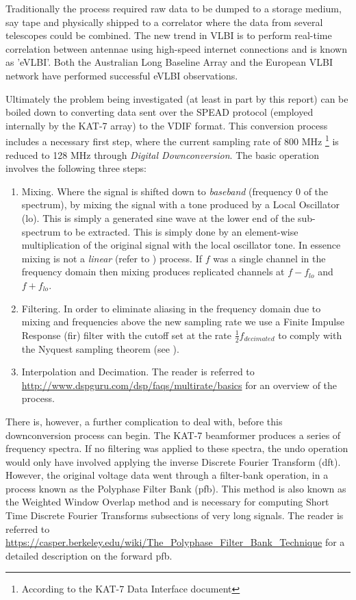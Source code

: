 \documentclass[a4paper,10pt]{article}
\begin{document}
Traditionally the process required raw data to be dumped to a storage medium, say tape and physically shipped to a correlator where the data from several 
telescopes could be combined. The new trend in VLBI is to perform real-time correlation between antennae using high-speed internet connections and is known
as 'eVLBI'. Both the Australian Long Baseline Array and the European VLBI network have performed successful eVLBI observations.

Ultimately the problem being investigated (at least in part by this report) can be boiled down to converting data sent over the SPEAD protocol (employed 
internally by the KAT-7 array) to the VDIF format. This conversion process includes a necessary first step, where the current sampling rate of 800 MHz
\footnote{According to the KAT-7 Data Interface document} is reduced to 128 MHz through \textit{Digital Downconversion}. The basic operation involves the following three
steps:
\begin{enumerate}
 \item Mixing. Where the signal is shifted down to \textit{baseband} (frequency 0 of the spectrum), by mixing the signal with a tone produced by a Local Oscillator (\gls{lo}).
 This is simply a generated sine wave at the lower end of the sub-spectrum to be extracted. This is simply done by an element-wise multiplication of the original signal with
 the local oscillator tone. In essence mixing is not a \textit{linear} (refer to \cite[ch. 5]{smith1997scientist}) process. If $f$ was a single channel in the 
 frequency domain then mixing produces replicated channels at $f - f_{lo}$ and $f + f_{lo}$.
 \item Filtering. In order to eliminate aliasing in the frequency domain due to mixing and frequencies above the new sampling rate we use a Finite Impulse Response 
 (\gls{fir}) filter with the cutoff set at the rate $\frac{1}{2}f_{decimated}$ to comply with the Nyquest sampling theorem (see \cite[ch. 3]{smith1997scientist}).
 \item Interpolation and Decimation. The reader is referred to \url{http://www.dspguru.com/dsp/faqs/multirate/basics} for an overview of the process.  
\end{enumerate}

There is, however, a further complication to deal with, before this downconversion process can begin. The KAT-7 beamformer produces a series of frequency spectra. If no filtering 
was applied to these spectra, the undo operation would only have involved applying the inverse Discrete Fourier Transform (\gls{dft}). However, the original voltage data went 
through a filter-bank operation, in a process known as the Polyphase Filter Bank (\gls{pfb}). This method is also known as the Weighted Window Overlap method and is necessary for computing 
Short Time Discrete Fourier Transforms subsections of very long signals. The reader is referred to \url{https://casper.berkeley.edu/wiki/The_Polyphase_Filter_Bank_Technique} for a detailed 
description on the forward \gls{pfb}.
\end{document}
